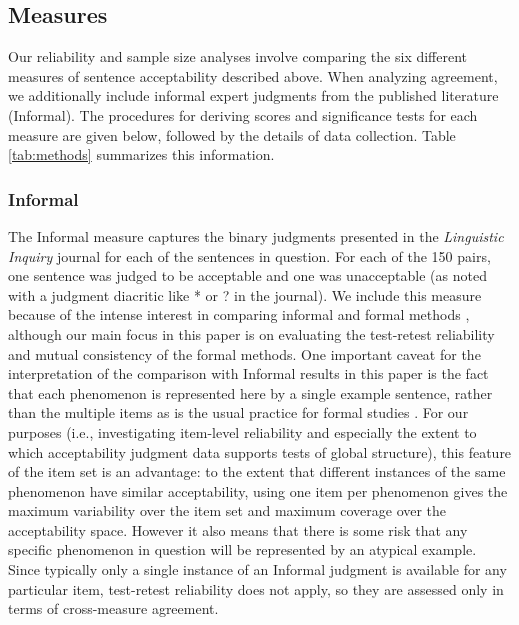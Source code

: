 \documentclass[doc]{apa6}
\newcommand{\informal}{{\sc Informal}}
\begin{document}
\subsection{Measures}

Our reliability and sample size analyses involve comparing the six different measures of sentence acceptability described above. When analyzing agreement, we additionally include informal expert judgments from the published literature (\informal). The procedures for deriving scores and significance tests for each measure are given below, followed by the details of data collection. Table \ref{tab:methods} summarizes this information.

\subsubsection{Informal}

The \informal{} measure captures the binary judgments presented in the {\it Linguistic Inquiry} journal for each of the sentences in question. For each of the 150 pairs, one sentence was judged to be acceptable and one was unacceptable (as noted with a judgment diacritic like * or ? in the journal). We include this measure because of the intense interest in comparing informal and formal methods \citep{sprouse2013formalinformal,gibson2013needforquantmethods,munro2010crowdsourcinglanguagestudies,myers2012testingislandconstraints,featherston2007datastickandcarrot,sprouse2012revisitingadgerscoresyntax}, although our main focus in this paper is on evaluating the test-retest reliability and mutual consistency of the formal methods.
One important caveat for the interpretation of the comparison with \informal{} results in this paper is the fact that each phenomenon is represented here by a single example sentence, rather than the multiple items as is the usual practice for formal studies \citep{myers2009smallexpdesign}. For our  purposes (i.e., investigating item-level reliability and especially the extent to which acceptability judgment data supports tests of global structure), this feature of the item set is an advantage: to the extent that different instances of the same phenomenon have similar acceptability, using one item per phenomenon gives the maximum variability over the item set and maximum coverage over the acceptability space. However it also means that there is some risk that any specific phenomenon in question will be represented by an atypical example.
Since typically only a single instance of an \informal{} judgment is available for any particular item, test-retest reliability does not apply, so they are assessed only in terms of cross-measure agreement.
\end{document}
